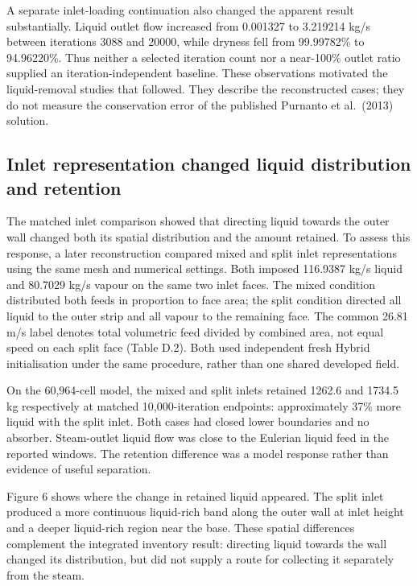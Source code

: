 A separate inlet-loading continuation also changed the apparent result substantially. Liquid outlet flow increased from 0.001327 to 3.219214 kg/s between iterations 3088 and 20000, while dryness fell from 99.99782\% to 94.96220\%. Thus neither a selected iteration count nor a near-100\% outlet ratio supplied an iteration-independent baseline. These observations motivated the liquid-removal studies that followed. They describe the reconstructed cases; they do not measure the conservation error of the published Purnanto et al.~(2013) solution.

\subsection{Inlet representation changed liquid distribution and retention}

The matched inlet comparison showed that directing liquid towards the outer wall changed both its spatial distribution and the amount retained. To assess this response, a later reconstruction compared mixed and split inlet representations using the same mesh and numerical settings. Both imposed 116.9387 kg/s liquid and 80.7029 kg/s vapour on the same two inlet faces. The mixed condition distributed both feeds in proportion to face area; the split condition directed all liquid to the outer strip and all vapour to the remaining face. The common 26.81 m/s label denotes total volumetric feed divided by combined area, not equal speed on each split face (Table D.2). Both used independent fresh Hybrid initialisation under the same procedure, rather than one shared developed field.

On the 60,964-cell model, the mixed and split inlets retained 1262.6 and 1734.5 kg respectively at matched 10,000-iteration endpoints: approximately 37\% more liquid with the split inlet. Both cases had closed lower boundaries and no absorber. Steam-outlet liquid flow was close to the Eulerian liquid feed in the reported windows. The retention difference was a model response rather than evidence of useful separation.

Figure 6 shows where the change in retained liquid appeared. The split inlet produced a more continuous liquid-rich band along the outer wall at inlet height and a deeper liquid-rich region near the base. These spatial differences complement the integrated inventory result: directing liquid towards the wall changed its distribution, but did not supply a route for collecting it separately from the steam.

